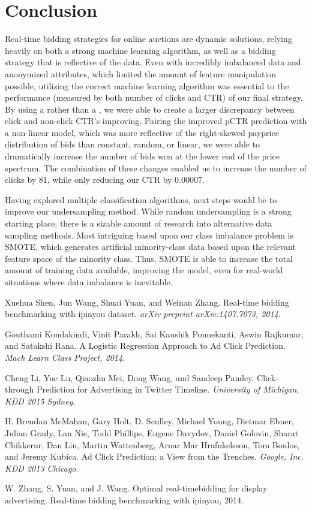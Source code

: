 \documentclass{sig-alternate-05-2015}
\begin{document}
\section{Conclusion}
Real-time bidding strategies for online auctions are dynamic solutions, relying heavily on both a strong machine learning algorithm, as well as a bidding strategy that is reflective of the data. Even with incredibly imbalanced data and anonymized attributes, which limited the amount of feature manipulation possible, utilizing the correct machine learning algorithm was essential to the performance (measured by both number of clicks and CTR) of our final strategy. By using a  rather than a , we were able to create a larger discrepancy between click and non-click CTR's improving. Pairing the improved pCTR prediction with a non-linear model, which was more reflective of the right-skewed payprice distribution of bids than constant, random, or linear, we were able to dramatically increase the number of bids won at the lower end of the price spectrum.  The combination of these changes enabled us to increase the number of clicks by 81, while only reducing our CTR by 0.00007.

Having explored multiple classification algorithms, next steps would be to improve our undersampling method.  While random undersampling is a strong starting place, there is a sizable amount of research into alternative data sampling methods. Most intriguing based upon our class imbalance problem is SMOTE, which generates artificial minority-class data based upon the relevant feature space of the minority class. Thus, SMOTE is able to increase the total amount of training data available, improving the model, even for real-world situations where data imbalance is inevitable.

\begin{thebibliography}{4}
Xuehua Shen, Jun Wang, Shuai Yuan, and Weinan Zhang.
Real-time bidding benchmarking with ipinyou
dataset.
\textit{arXiv preprint arXiv:1407.7073, 2014.}

Gouthami Kondakindi, Vinit Parakh, Sai Kaushik Ponnekanti, Aswin Rajkumar, and Satakshi Rana.
A Logistic Regression Approach to Ad Click
Prediction.
\textit{Mach Learn Class Project, 2014}.

Cheng Li, Yue Lu, Qiaozhu Mei, Dong Wang, and Sandeep Pandey.
Click-through Prediction for Advertising in Twitter Timeline.
\textit{University of Michigan, KDD 2015 Sydney}.

H. Brendan McMahan, Gary Holt, D. Sculley, Michael Young, Dietmar Ebner, Julian Grady, Lan Nie, Todd Phillips, Eugene Davydov, Daniel Golovin, Sharat Chikkerur, Dan Liu, Martin Wattenberg, Arnar Mar Hrafnkelsson, Tom Boulos, and Jeremy Kubica.
Ad Click Prediction: a View from the Trenches.
\textit{Google, Inc. KDD 2013 Chicago}.

W. Zhang, S. Yuan, and J. Wang.
Optimal real-timebidding for display advertising.
Real-time bidding benchmarking with ipinyou, 2014.

\end{thebibliography}
\end{document}
